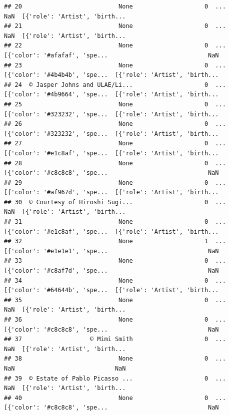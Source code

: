 \documentclass[
]{book}
\begin{document}
\begin{verbatim}
## 20                           None                    0  ...                            NaN  [{'role': 'Artist', 'birth...
## 21                           None                    0  ...                            NaN  [{'role': 'Artist', 'birth...
## 22                           None                    0  ...  [{'color': '#afafaf', 'spe...                            NaN
## 23                           None                    0  ...  [{'color': '#4b4b4b', 'spe...  [{'role': 'Artist', 'birth...
## 24  © Jasper Johns and ULAE/Li...                    0  ...  [{'color': '#4b9664', 'spe...  [{'role': 'Artist', 'birth...
## 25                           None                    0  ...  [{'color': '#323232', 'spe...  [{'role': 'Artist', 'birth...
## 26                           None                    0  ...  [{'color': '#323232', 'spe...  [{'role': 'Artist', 'birth...
## 27                           None                    0  ...  [{'color': '#e1c8af', 'spe...  [{'role': 'Artist', 'birth...
## 28                           None                    0  ...  [{'color': '#c8c8c8', 'spe...                            NaN
## 29                           None                    0  ...  [{'color': '#af967d', 'spe...  [{'role': 'Artist', 'birth...
## 30  © Courtesy of Hiroshi Sugi...                    0  ...                            NaN  [{'role': 'Artist', 'birth...
## 31                           None                    0  ...  [{'color': '#e1c8af', 'spe...  [{'role': 'Artist', 'birth...
## 32                           None                    1  ...  [{'color': '#e1e1e1', 'spe...                            NaN
## 33                           None                    0  ...  [{'color': '#c8af7d', 'spe...                            NaN
## 34                           None                    0  ...  [{'color': '#64644b', 'spe...  [{'role': 'Artist', 'birth...
## 35                           None                    0  ...                            NaN  [{'role': 'Artist', 'birth...
## 36                           None                    0  ...  [{'color': '#c8c8c8', 'spe...                            NaN
## 37                   © Mimi Smith                    0  ...                            NaN  [{'role': 'Artist', 'birth...
## 38                           None                    0  ...                            NaN                            NaN
## 39  © Estate of Pablo Picasso ...                    0  ...                            NaN  [{'role': 'Artist', 'birth...
## 40                           None                    0  ...  [{'color': '#c8c8c8', 'spe...                            NaN

\end{verbatim}
\end{document}

